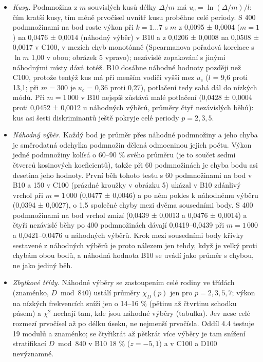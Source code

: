 \documentclass[
  10pt,
]{article}
\providecommand{\tightlist}{%
  \setlength{\itemsep}{0pt}\setlength{\parskip}{0pt}}
\begin{document}
\begin{itemize}
\tightlist
\item
  \emph{Kusy.} Podmnožina z \(m\) souvislých kusů délky \(\Delta/m\) má
  \(u_c = \ln(\Delta/m)/l\): čím kratší kusy, tím méně prvočísel uvnitř
  kusu proběhne celé periody. S 400 podmnožinami na bod roste výkon při
  \(k = 1 \dots 7\) s \(m\) z 0,0095 ± 0,0004 (\(m = 1\)) na 0,0476 ±
  0,0014 (náhodný výběr) v B10 a z 0,0206 ± 0,0008 na 0,0508 ± 0,0017 v
  C100, v mezích chyb monotónně (Spearmanova pořadová korelace s
  \(\ln m\) 1,00 v obou; obrázek 5 vpravo); nezávislé zopakování s
  jinými náhodnými místy dává totéž. B10 dosáhne náhodné hodnoty později
  než C100, protože tentýž kus má při menším vodiči vyšší mez \(u_c\)
  (\(l\) = 9,6 proti 13,1; při \(m = 300\) je \(u_c\) = 0,36 proti
  0,27), potlačení tedy sahá dál do nízkých módů. Při \(m = 1\,000\) v
  B10 nejspíš zůstává malé potlačení (0,0428 ± 0,0004 proti 0,0452 ±
  0,0012 u náhodných výběrů, průměry čtyř nezávislých běhů): kus asi
  šesti diskriminantů ještě pokryje celé periody \(p = 2, 3, 5\).
\item
  \emph{Náhodný výběr.} Každý bod je průměr přes náhodné podmnožiny a
  jeho chyba je směrodatná odchylka podmnožin dělená odmocninou jejich
  počtu. Výkon jedné podmnožiny kolísá o 60--90 \% svého průměru (je to
  součet sedmi čtverců kosinových koeficientů), takže při 60
  podmnožinách je chyba bodu asi desetina jeho hodnoty. První běh tohoto
  testu s 60 podmnožinami na bod v B10 a 150 v C100 (prázdné kroužky v
  obrázku 5) ukázal v B10 zdánlivý vrchol při \(m = 1\,000\) (0,0477 ±
  0,0046) a po něm pokles k náhodnému výběru (0,0394 ± 0,0027), o 1,5
  společné chyby mezi dvěma sousedními body. S 400 podmnožinami na bod
  vrchol zmizí (0,0439 ± 0,0013 a 0,0476 ± 0,0014) a čtyři nezávislé
  běhy po 400 podmnožinách dávají 0,0419--0,0439 při \(m = 1\,000\) a
  0,0421--0,0476 u náhodných výběrů. Krok mezi sousedními body křivky
  sestavené z náhodných výběrů je proto nálezem jen tehdy, když je velký
  proti chybám obou bodů, a náhodná hodnota B10 se uvádí jako průměr s
  chybou, ne jako jediný běh.
\item
  \emph{Zbytkové třídy.} Náhodné výběry se zastoupením celé rodiny ve
  třídách (znaménko, \(D \bmod 840\)) ustálí průměry \(\chi_D(p)\) jen
  pro \(p = 2, 3, 5, 7\); výkon na nízkých frekvencích sníží jen o
  14--16 \% (pětinu až čtvrtinu schodku pásem) a \(\chi^2\) nechají tam,
  kde jsou náhodné výběry (tabulka). Jev nese celé rozmezí prvočísel až
  po délku úseku, ne nejmenší prvočísla. Oddíl 4.4 testuje 19 modulů a
  znaménko; se čtyřikrát až pětkrát více výběry je tam snížení
  stratifikací \(D \bmod 840\) v B10 18 \% (\(z = -5{,}1\)) a v C100 a
  D100 nevýznamné.
\end{itemize}
\end{document}
